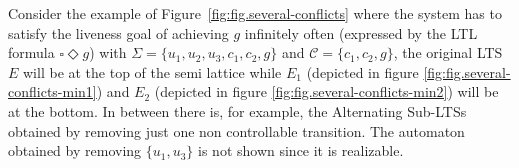 Consider the example of Figure~\ref{fig:fig.several-conflicts} where the system has to satisfy the liveness goal of
achieving $g$ infinitely often (expressed
by the LTL formula $\square \Diamond g$)
with $\Sigma = \{u_1, u_2, u_3, c_1, c_2, g\}$ and 
$\mathcal{C} = \{c_1, c_2, g\}$, the original LTS $E$ will be
at the top of the semi lattice while $E_1$ (depicted in figure \ref{fig:fig.several-conflicts-min1}) and $E_2$ (depicted in 
figure \ref{fig:fig.several-conflicts-min2}) will be at 
the bottom.  In between there is, for example, the Alternating Sub-LTSs
obtained by removing just one non controllable transition.  
The automaton obtained by removing $\{u_1, u_3\}$ is not shown
since it is realizable. 
%
%
%

 

